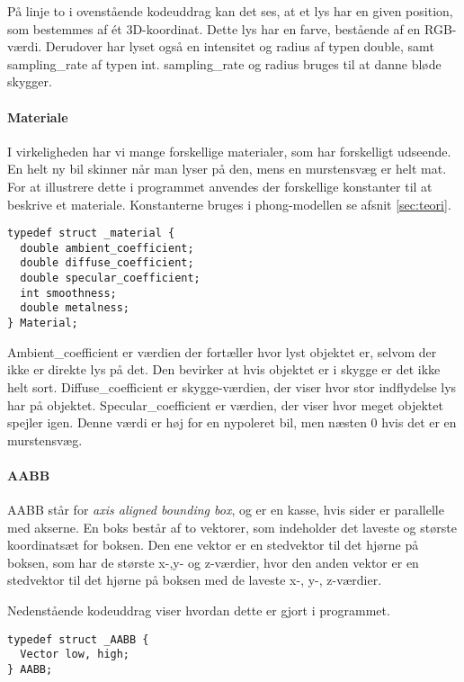 På linje to i ovenstående kodeuddrag kan det ses, at et lys har en given position, som bestemmes af ét 3D-koordinat. Dette lys har en farve, bestående af en RGB-værdi. Derudover har lyset også en intensitet og radius af typen double, samt sampling\_rate af typen int. sampling\_rate og radius bruges til at danne bløde skygger.

\paragraph{Materiale}
I virkeligheden har vi mange forskellige materialer, som har forskelligt udseende. En helt ny bil skinner når man lyser på den, mens en murstensvæg er helt mat. For at illustrere dette i programmet anvendes der forskellige konstanter til at beskrive et materiale. Konstanterne bruges i phong-modellen se afsnit \ref{sec:teori}.

\begin{lstlisting}[style=Cstyle, caption=Struct til Material]
typedef struct _material {
  double ambient_coefficient;
  double diffuse_coefficient;
  double specular_coefficient;
  int smoothness;
  double metalness; 
} Material;
\end{lstlisting}

Ambient\_coefficient er værdien der fortæller hvor lyst objektet er, selvom der ikke er direkte lys på det. Den bevirker at hvis objektet er i skygge er det ikke helt sort.
Diffuse\_coefficient er skygge-værdien, der viser hvor stor indflydelse lys har på objektet. 
Specular\_coefficient er værdien, der viser hvor meget objektet spejler igen. Denne værdi er høj for en nypoleret bil, men næsten 0 hvis det er en murstensvæg.

\paragraph{AABB}
AABB står for \textit{axis aligned bounding box}, og er en kasse, hvis sider er parallelle med akserne. En boks består af to vektorer, som indeholder det laveste og største koordinatsæt for boksen. Den ene vektor er en stedvektor til det hjørne på boksen, som har de største x-,y- og z-værdier, hvor den anden vektor er en stedvektor til det hjørne på boksen med de laveste x-, y-, z-værdier. 

Nedenstående kodeuddrag viser hvordan dette er gjort i programmet.

\begin{lstlisting}[style=Cstyle, caption=Struct til bounding boxes]
typedef struct _AABB {
  Vector low, high;
} AABB;
\end{lstlisting}

